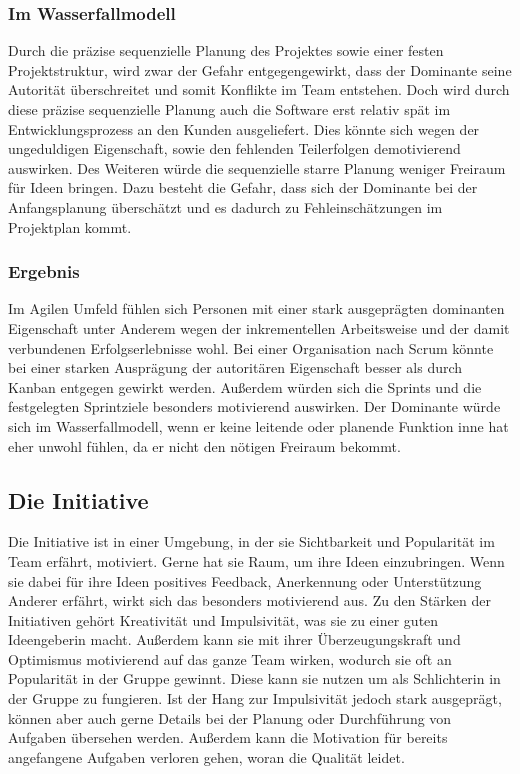 \documentclass[twocolumn,10pt]{asme2ej}
\begin{document}
\subsubsection{Im Wasserfallmodell}
Durch die präzise sequenzielle Planung des Projektes sowie einer festen Projektstruktur, wird zwar der Gefahr entgegengewirkt, dass der Dominante seine Autorität überschreitet und somit Konflikte im Team entstehen. Doch wird durch diese präzise sequenzielle Planung auch die Software erst relativ spät im Entwicklungsprozess an den Kunden ausgeliefert. Dies könnte sich wegen der ungeduldigen Eigenschaft, sowie den fehlenden Teilerfolgen demotivierend auswirken. Des Weiteren würde die sequenzielle starre Planung weniger Freiraum für Ideen bringen. Dazu besteht die Gefahr, dass sich der Dominante bei der Anfangsplanung überschätzt und es dadurch zu Fehleinschätzungen im Projektplan kommt.

\subsubsection{Ergebnis}
Im Agilen Umfeld fühlen sich Personen mit einer stark ausgeprägten dominanten Eigenschaft unter Anderem wegen der inkrementellen Arbeitsweise und der damit verbundenen Erfolgserlebnisse wohl. Bei einer Organisation nach Scrum könnte bei einer starken Ausprägung der autoritären Eigenschaft besser als durch Kanban entgegen gewirkt werden. Außerdem würden sich die Sprints und die festgelegten Sprintziele besonders motivierend auswirken. Der Dominante würde sich im Wasserfallmodell, wenn er keine leitende oder planende Funktion inne hat eher unwohl fühlen, da er nicht den nötigen Freiraum bekommt.

\subsection{Die Initiative}
Die Initiative ist in einer Umgebung, in der sie Sichtbarkeit und Popularität im Team erfährt, motiviert. Gerne hat sie Raum, um ihre Ideen einzubringen. Wenn sie dabei für ihre Ideen positives Feedback, Anerkennung oder Unterstützung Anderer erfährt, wirkt sich das besonders motivierend aus. Zu den Stärken der Initiativen gehört Kreativität und Impulsivität, was sie zu einer guten Ideengeberin macht. Außerdem kann sie mit ihrer Überzeugungskraft und Optimismus motivierend auf das ganze Team wirken, wodurch sie oft an Popularität in der Gruppe gewinnt. Diese kann sie nutzen um als Schlichterin in der Gruppe zu fungieren. Ist der Hang zur Impulsivität jedoch stark ausgeprägt, können aber auch gerne Details bei der Planung oder Durchführung von Aufgaben übersehen werden. Außerdem kann die Motivation für bereits angefangene Aufgaben verloren gehen, woran die Qualität leidet.
\end{document}
